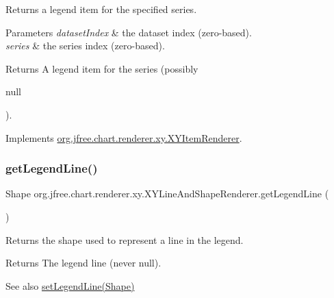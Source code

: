 Returns a legend item for the specified series.


\begin{DoxyParams}{Parameters}
{\em dataset\+Index} & the dataset index (zero-\/based). \\
\hline
{\em series} & the series index (zero-\/based).\\
\hline
\end{DoxyParams}
\begin{DoxyReturn}{Returns}
A legend item for the series (possibly
\begin{DoxyCode}
null 
\end{DoxyCode}
 ). 
\end{DoxyReturn}


Implements \mbox{\hyperlink{interfaceorg_1_1jfree_1_1chart_1_1renderer_1_1xy_1_1_x_y_item_renderer_a792c3e8c39bf57711528cd8064d2ddb5}{org.\+jfree.\+chart.\+renderer.\+xy.\+X\+Y\+Item\+Renderer}}.

\mbox{\label{classorg_1_1jfree_1_1chart_1_1renderer_1_1xy_1_1_x_y_line_and_shape_renderer_ae016f74b6e454ecf1143b2e542aa35cc}} 
\subsubsection{\texorpdfstring{get\+Legend\+Line()}{getLegendLine()}}
{\footnotesize\ttfamily Shape org.\+jfree.\+chart.\+renderer.\+xy.\+X\+Y\+Line\+And\+Shape\+Renderer.\+get\+Legend\+Line (\begin{DoxyParamCaption}{ }\end{DoxyParamCaption})}

Returns the shape used to represent a line in the legend.

\begin{DoxyReturn}{Returns}
The legend line (never {\ttfamily null}).
\end{DoxyReturn}
\begin{DoxySeeAlso}{See also}
\mbox{\hyperlink{classorg_1_1jfree_1_1chart_1_1renderer_1_1xy_1_1_x_y_line_and_shape_renderer_ad7e97da27d2d5c3b9eb1c3a89d471e19}{set\+Legend\+Line(\+Shape)}} 
\end{DoxySeeAlso}
\mbox{\label{classorg_1_1jfree_1_1chart_1_1renderer_1_1xy_1_1_x_y_line_and_shape_renderer_af0fece769cf57e414721478f2b43411c}} 

